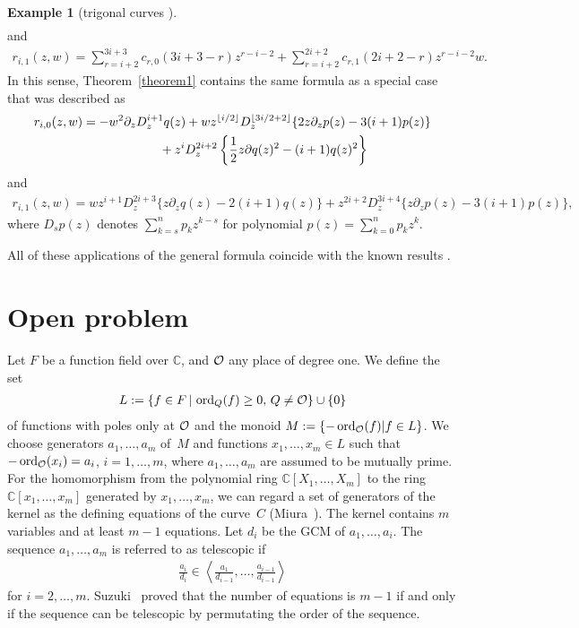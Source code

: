 \documentclass[pdftex]{sigma}
\numberwithin{equation}{section}
\theoremstyle{definition}
\newtheorem{rei}[teiri]{Example}
\begin{document}
\begin{rei}[trigonal curves \cite{DD,GG}]
\begin{gather*}
\end{gather*}
and
\begin{gather*}r_{i,1}(z,w)=\sum_{r=i+2}^{3i+3}c_{r,0}(3i+3-r)z^{r-i-2}+\sum_{r=i+2}^{2i+2}c_{r,1}(2i+2-r)z^{r-i-2}w.\end{gather*}
In this sense, Theorem~\ref{theorem1} contains the same formula \cite[p.~203]{GG} as a special case that was described as
\begin{gather*}
r_{i,0}(z,w) = -w^2\partial_zD_z^{i+1}q(z)+wz^{\lfloor i/2 \rfloor}D_z^{\lfloor 3i/2+2\rfloor}\{2z\partial_z p(z)-3(i+1)p(z) \}\\
\hphantom{r_{i,0}(z,w) =}{} +
z^iD_z^{2i+2}\left\{\frac{1}{2}z\partial q(z)^2-(i+1)q(z)^2\right\}
\end{gather*}
and
\begin{gather*}r_{i,1}(z,w)=wz^{i+1}D_z^{2i+3}\{z\partial_zq(z)-2(i+1)q(z)\}+z^{2i+2}D_z^{3i+4}\{z\partial_zp(z)-3(i+1)p(z)\},\end{gather*}
where $D_sp(z)$ denotes $\sum\limits_{k=s}^np_kz^{k-s}$ for polynomial $p(z)=\sum\limits_{k=0}^np_kz^k$.
\end{rei}

All of these applications of the general formula coincide with the known results \cite{DD,GG}.

\section{Open problem}\label{section4}

Let $F$ be a function f\/ield over $\mathbb C$, and $\cal O$ any place of degree one. We def\/ine the set
\begin{gather*}{L}:=\{f\in F\,|\,\operatorname{ord}_Q(f)\geq 0, \,Q\not={\cal O}\}\cup \{0\}\end{gather*}
of functions with poles only at $\cal O$ and the monoid $M:=\{-\operatorname{ord}_{\cal O}(f)|f\in L\}$. We choose generators $a_1,\dots,a_m$ of~$M$ and functions $x_1,\dots,x_m \in {L}$ such that $-\operatorname{ord}_{\cal O}(x_i)=a_i$, $i=1,\dots,m$, where $a_1,\dots,a_m$ are assumed to be mutually prime. For the homomorphism from the polynomial ring ${\mathbb C}[X_1,\dots,X_m]$ to the ring ${\mathbb C}[x_1,\dots,x_m]$ generated by $x_1,\dots,x_m$, we can regard a set of generators of the kernel as the def\/ining equations of the curve~$C$ (Miura~\cite{miura}). The kernel contains $m$ variables and at least $m-1$ equations. Let $d_i$ be the GCM of $a_1,\dots,a_i$. The sequence $a_1,\dots,a_m$ is referred to as telescopic if
\begin{gather*}\frac{a_i}{d_i}\in \left\langle\frac{a_1}{d_{i-1}},\dots,\frac{a_{i-1}}{d_{i-1}}\right\rangle \end{gather*}
for $i=2,\dots,m$. Suzuki~\cite{suzuki} proved that the number of equations is $m-1$ if and only if the sequence can be telescopic by permutating the order of the sequence.
\end{document}
